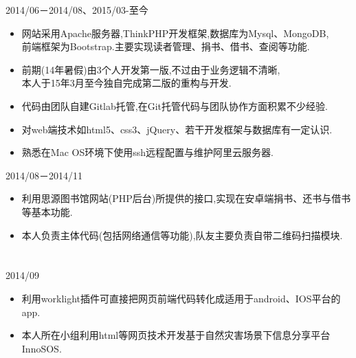 \documentclass[margin]{res}
\begin{document}
\begin{resume}
                {} \hfill 2014/06－2014/08、2015/03-至今 \\
                 \begin{itemize}  \itemsep -2pt %
                 \item 网站采用Apache服务器,ThinkPHP开发框架,数据库为Mysql、MongoDB,\\
                 前端框架为Bootstrap.主要实现读者管理、捐书、借书、查阅等功能. 
                 \item 前期(14年暑假)由3个人开发第一版,不过由于业务逻辑不清晰,\\本人于15年3月至今独自完成第二版的重构与开发.
                 \item 代码由团队自建Gitlab托管,在Git托管代码与团队协作方面积累不少经验.
                 \item 对web端技术如html5、css3、jQuery、若干开发框架与数据库有一定认识.
                 \item 熟悉在Mac OS环境下使用ssh远程配置与维护阿里云服务器.
                 \end{itemize} 

                {} \hfill 2014/08－2014/11 \\
                \begin{itemize}
                \item 利用思源图书馆网站(PHP后台)所提供的接口,实现在安卓端捐书、还书与借书\\ 
                等基本功能. 
                \item 本人负责主体代码(包括网络通信等功能),队友主要负责自带二维码扫描模块.
                \end{itemize} 
 
\section{}    
            { }\hfill 2014/09 \\   
            \begin{itemize}
                \item 利用worklight插件可直接把网页前端代码转化成适用于android、IOS平台的app. 
                \item 本人所在小组利用html等网页技术开发基于自然灾害场景下信息分享平台InnoSOS.
                \end{itemize}   


\end{resume}
\end{document}
